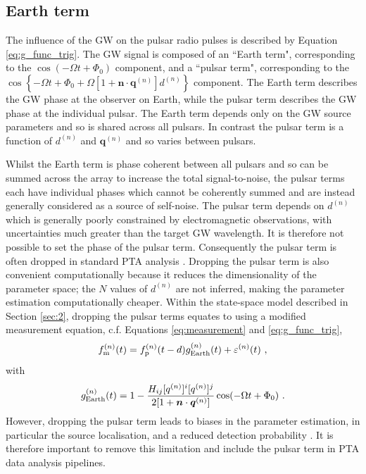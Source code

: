 \documentclass[fleqn,usenatbib,useAMS]{mnras}
\begin{document}
\subsection{Earth term}\label{sec:earth_term}
The influence of the GW on the pulsar radio pulses is described by Equation \eqref{eq:g_func_trig}. The GW signal is composed of an ``Earth term", corresponding to the $\cos(-\Omega t + \Phi_0)$ component, and a ``pulsar term", corresponding to the $\cos \left \{-\Omega t +\Phi_0 + \Omega \left[1 + \boldsymbol{n}\cdot \boldsymbol{q}^{(n)} \right]  d^{(n)} \right \}$ component. The Earth term describes the GW phase at the observer on Earth, while the pulsar term describes the GW phase at the individual pulsar. The Earth term depends only on the GW source parameters and so is shared across all pulsars. In contrast the pulsar term is a function of $d^{(n)}$ and $\boldsymbol{q}^{(n)}$ and so varies between pulsars. \newline 


Whilst the Earth term is phase coherent between all pulsars and so can be summed across the array to increase the total signal-to-noise, the pulsar terms each have individual phases which cannot be coherently summed and are instead generally considered as a source of self-noise. The pulsar term depends on $d^{(n)}$ which is generally poorly constrained by electromagnetic observations, with uncertainties much greater than the target GW wavelength. It is therefore not possible to set the phase of the pulsar term. Consequently the pulsar term is often dropped in standard PTA analysis \citep[e.g.][]{Sesana2010,Babak2012,Petiteau2013,Zhu2015,Taylors2016,Goldstein2018,Charisi2023arXiv230403786C}. Dropping the pulsar term is also convenient computationally because it reduces the dimensionality of the parameter space; the $N$ values of $d^{(n)}$ are not inferred, making the parameter estimation computationally cheaper. Within the state-space model described in Section \ref{sec:2}, dropping the pulsar terms equates to using a modified measurement equation, c.f. Equations \eqref{eq:measurement} and \eqref{eq:g_func_trig},
\begin{equation}
	f_{\rm m}^{(n)}(t) = f_{\rm p}^{(n)}(t-d) g^{(n)}_{\rm Earth}(t) + \varepsilon^{(n)}(t) \ , 
	\label{eq:measuremen_earth}
\end{equation}
with
\begin{equation}
	g^{(n)}_{\rm Earth}(t) = 1 - \frac{ H_{ij}[q^{(n)}]^i [q^{(n)}]^j}{2[1 + \boldsymbol{n}\cdot \boldsymbol{q}^{(n)}] }  \cos(-\Omega t +\Phi_0)  \ .
	\label{eq:g_func_trig_earth}
\end{equation}
However, dropping the pulsar term leads to biases in the parameter estimation, in particular the source localisation, and a reduced detection probability \citep{Zhupulsarterms,Chen2022,KimpsonPTA}. It is therefore important to remove this limitation and include the pulsar term in PTA data analysis pipelines.
\end{document}
